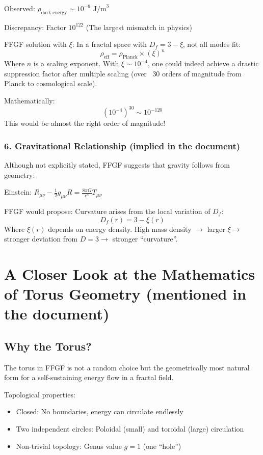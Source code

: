 \documentclass[12pt,a4paper]{article}
\begin{document}
	Observed: \( \rho_{\text{dark energy}} \sim 10^{-9} \text{ J/m}^3 \)
	
	Discrepancy: Factor \( 10^{122} \) (The largest mismatch in physics)
	
	FFGF solution with \( \xi \):
	In a fractal space with \( D_f = 3 - \xi \), not all modes fit:
	\[
	\rho_{\text{eff}} = \rho_{\text{Planck}} \times (\xi)^n
	\]
	Where \( n \) is a scaling exponent. With \( \xi \sim 10^{-4} \), one could indeed achieve a drastic suppression factor after multiple scaling (over ~30 orders of magnitude from Planck to cosmological scale).
	
	Mathematically:
	\[
	(10^{-4})^{30} \sim 10^{-120}
	\]
	This would be almost the right order of magnitude!
	
	\subsubsection{6. Gravitational Relationship (implied in the document)}
	Although not explicitly stated, FFGF suggests that gravity follows from geometry:
	
	Einstein: \( R_{\mu\nu} - \frac{1}{2}g_{\mu\nu}R = \frac{8\pi G}{c^4} T_{\mu\nu} \)
	
	FFGF would propose: Curvature arises from the local variation of \( D_f \):
	\[
	D_f(r) = 3 - \xi(r)
	\]
	Where \( \xi(r) \) depends on energy density. High mass density \( \rightarrow \) larger \( \xi \rightarrow \) stronger deviation from \( D=3 \rightarrow \) stronger ``curvature''.
	\section{A Closer Look at the Mathematics of Torus Geometry (mentioned in the document)}
\subsection{Why the Torus?}
The torus in FFGF is not a random choice but the geometrically most natural form for a self-sustaining energy flow in a fractal field.

Topological properties:
\begin{itemize}
	\item Closed: No boundaries, energy can circulate endlessly
	\item Two independent circles: Poloidal (small) and toroidal (large) circulation
	\item Non-trivial topology: Genus value \( g = 1 \) (one ``hole'')
\end{itemize}
\end{document}
